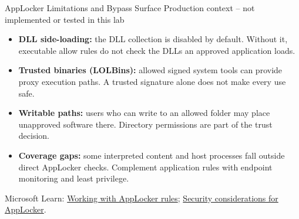 \documentclass[aspectratio=169,10pt]{beamer}
\newcommand{\orangelabel}[1]{%
	{\color{PortfolioOrange}\large #1}
}
\begin{document}
	\begin{frame}{AppLocker Limitations and Bypass Surface}
\orangelabel{Production context -- not implemented or tested in this lab}
\vspace{.25cm}
\begin{itemize}\small\setlength\itemsep{.24cm}
\item \textbf{DLL side-loading:} the DLL collection is disabled by default. Without it, executable allow rules do not check the DLLs an approved application loads.
\item \textbf{Trusted binaries (LOLBins):} allowed signed system tools can provide proxy execution paths. A trusted signature alone does not make every use safe.
\item \textbf{Writable paths:} users who can write to an allowed folder may place unapproved software there. Directory permissions are part of the trust decision.
\item \textbf{Coverage gaps:} some interpreted content and host processes fall outside direct AppLocker checks. Complement application rules with endpoint monitoring and least privilege.
\end{itemize}
\vspace{.18cm}
{\scriptsize Microsoft Learn: \href{https://learn.microsoft.com/en-us/windows/security/application-security/application-control/app-control-for-business/applocker/working-with-applocker-rules}{Working with AppLocker rules}; \href{https://learn.microsoft.com/en-us/windows/security/application-security/application-control/app-control-for-business/applocker/security-considerations-for-applocker}{Security considerations for AppLocker}.}
\end{frame}
	
\end{document}
